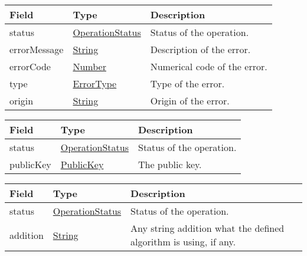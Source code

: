 \documentclass[a4paper]{arrowhead}
\newcommand{\pref}[1]{{\textcolor{ArrowheadGrey}{\hyperref[sec:model:primitives:#1]{#1}}}}
\begin{document}

\begin{table}[ht!]
\begin{tabularx}{\textwidth}{| p{4.25cm} | p{3.5cm} | X |} \hline
\rowcolor{gray!33} Field & Type      & Description \\ \hline
status & \pref{OperationStatus} & Status of the operation. \\ \hline
errorMessage & \pref{String} & Description of the error. \\ \hline
errorCode &\pref{Number}  & Numerical code of the error. \\ \hline
type & \pref{ErrorType} & Type of the error. \\ \hline
origin & \pref{String} & Origin of the error. \\ \hline
\end{tabularx}
\end{table}


\begin{table}[ht!]
\begin{tabularx}{\textwidth}{| p{4.25cm} | p{4.5cm} | X |} \hline
\rowcolor{gray!33} Field & Type & Description \\ \hline
status & \pref{OperationStatus} & Status of the operation. \\ \hline
publicKey & \pref{PublicKey} & The public key. \\ \hline
\end{tabularx}
\end{table}

\clearpage


\begin{table}[ht!]
\begin{tabularx}{\textwidth}{| p{4.25cm} | p{4.5cm} | X |} \hline
\rowcolor{gray!33} Field & Type & Description \\ \hline
status & \pref{OperationStatus} & Status of the operation. \\ \hline
addition & \pref{String} & Any string addition what the defined algorithm is using, if any. \\ \hline
\end{tabularx}
\end{table}

\end{document}
